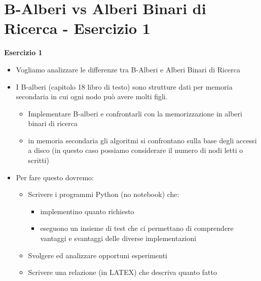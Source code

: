 \part{B-Alberi vs Alberi Binari di Ricerca - Esercizio 1}

\begin{tcolorbox}[colback=lightgray!20,%
                  colframe=black,%
                  arc=3mm, auto outer arc,]
                  
    \textbf{Esercizio 1}
    \begin{itemize}
    
    \item Vogliamo analizzare le differenze tra B-Alberi e Alberi Binari di Ricerca

    \item I B-alberi (capitolo 18 libro di testo) sono strutture dati per memoria secondaria in cui ogni nodo può avere molti figli.

    \begin{itemize}
        \item Implementare B-alberi e confrontarli con la memorizzazione in alberi binari di ricerca
        \item in memoria secondaria gli algoritmi si confrontano sulla base degli accessi a disco (in questo caso possiamo considerare il numero di nodi letti o scritti)
    \end{itemize}
    
    \item Per fare questo dovremo:
    
        \begin{itemize}
          
            \item Scrivere i programmi Python (no notebook) che:
          
            \begin{itemize}
            
                \item implementino quanto richiesto
                
                \item eseguono un insieme di test che ci permettano di comprendere vantaggi e svantaggi delle diverse implementazioni
                
            \end{itemize}
                
            \item Svolgere ed analizzare opportuni esperimenti
            
            \item Scrivere una relazione (in LATEX) che descriva quanto fatto
            
        \end{itemize}
    \end{itemize}
    
\end{tcolorbox}

